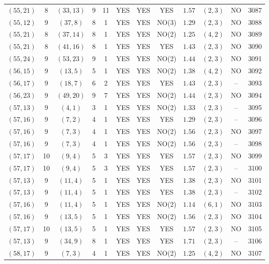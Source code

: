 \begin{longtable}{|c|c|c|c|c|c|c|c|c|c|c|c|}
$(55,21)$ & 8 & $(33,13)$ & 9 & 11 & YES & YES & YES & $1.57$ & $(2,3)$ & NO & 3087\\
$(55,12)$ & 9 & $(37,8)$ & 8 & 1 & YES & YES & NO(3) & $1.29$ & $(2,3)$ & NO & 3088\\
$(55,21)$ & 8 & $(37,14)$ & 8 & 1 & YES & YES & NO(2) & $1.25$ & $(4,2)$ & NO & 3089\\
$(55,21)$ & 8 & $(41,16)$ & 8 & 1 & YES & YES & YES & $1.43$ & $(2,3)$ & NO & 3090\\
$(55,24)$ & 9 & $(53,23)$ & 9 & 1 & YES & YES & NO(2) & $1.44$ & $(2,3)$ & NO & 3091\\
$(56,15)$ & 9 & $(13,5)$ & 5 & 1 & YES & YES & NO(2) & $1.38$ & $(4,2)$ & NO & 3092\\
$(56,17)$ & 9 & $(18,7)$ & 6 & 2 & YES & YES & YES & $1.43$ & $(2,3)$ & -- & 3093\\
$(56,23)$ & 9 & $(49,20)$ & 9 & 7 & YES & YES & NO(2) & $1.44$ & $(2,3)$ & NO & 3094\\
$(57,13)$ & 9 & $(4,1)$ & 3 & 1 & YES & YES & NO(2) & $1.33$ & $(2,3)$ & -- & 3095\\
$(57,16)$ & 9 & $(7,2)$ & 4 & 1 & YES & YES & YES & $1.29$ & $(2,3)$ & -- & 3096\\
$(57,16)$ & 9 & $(7,3)$ & 4 & 1 & YES & YES & NO(2) & $1.56$ & $(2,3)$ & NO & 3097\\
$(57,16)$ & 9 & $(7,3)$ & 4 & 1 & YES & YES & NO(2) & $1.56$ & $(2,3)$ & -- & 3098\\
$(57,17)$ & 10 & $(9,4)$ & 5 & 3 & YES & YES & YES & $1.57$ & $(2,3)$ & NO & 3099\\
$(57,17)$ & 10 & $(9,4)$ & 5 & 3 & YES & YES & YES & $1.57$ & $(2,3)$ & -- & 3100\\
$(57,13)$ & 9 & $(11,4)$ & 5 & 1 & YES & YES & YES & $1.38$ & $(2,3)$ & NO & 3101\\
$(57,13)$ & 9 & $(11,4)$ & 5 & 1 & YES & YES & YES & $1.38$ & $(2,3)$ & -- & 3102\\
$(57,16)$ & 9 & $(11,4)$ & 5 & 1 & YES & YES & NO(2) & $1.14$ & $(6,1)$ & NO & 3103\\
$(57,16)$ & 9 & $(13,5)$ & 5 & 1 & YES & YES & NO(2) & $1.56$ & $(2,3)$ & NO & 3104\\
$(57,17)$ & 10 & $(13,5)$ & 5 & 1 & YES & YES & YES & $1.57$ & $(2,3)$ & NO & 3105\\
$(57,13)$ & 9 & $(34,9)$ & 8 & 1 & YES & YES & YES & $1.71$ & $(2,3)$ & -- & 3106\\
$(58,17)$ & 9 & $(7,3)$ & 4 & 1 & YES & YES & NO(2) & $1.25$ & $(4,2)$ & NO & 3107\\

\end{longtable}
